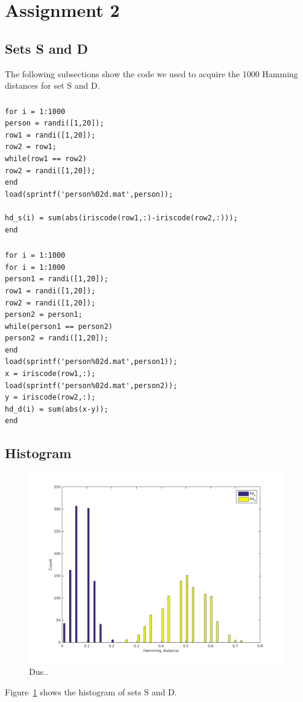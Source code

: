 \documentclass{article}
\begin{document}
\section{Assignment 2}
\setcounter{subsection}{2}
\subsection{Sets S and D}
The following subsections show the code we used to acquire the 1000 Hamming distances for set S and D.
\subsubsection{}
\begin{lstlisting}[title = Code for set S]
for i = 1:1000
person = randi([1,20]);
row1 = randi([1,20]);
row2 = row1;
while(row1 == row2)
row2 = randi([1,20]);
end
load(sprintf('person%02d.mat',person));

hd_s(i) = sum(abs(iriscode(row1,:)-iriscode(row2,:)));
end
\end{lstlisting}
\subsubsection{}
\begin{lstlisting}[title = Code for set D]
for i = 1:1000
for i = 1:1000
person1 = randi([1,20]);
row1 = randi([1,20]);
row2 = randi([1,20]);
person2 = person1;
while(person1 == person2)
person2 = randi([1,20]);
end
load(sprintf('person%02d.mat',person1));
x = iriscode(row1,:);
load(sprintf('person%02d.mat',person2));
y = iriscode(row2,:);
hd_d(i) = sum(abs(x-y));
end
\end{lstlisting}
\subsection{Histogram}
\begin{figure}[H]
	\centering
	\includegraphics[width=\linewidth]{plot2_4.png}
	\caption{Dus..}
	\label{fig2.4}
\end{figure}
Figure~\ref{fig2.4} shows the histogram of sets S and D.
\end{document}
